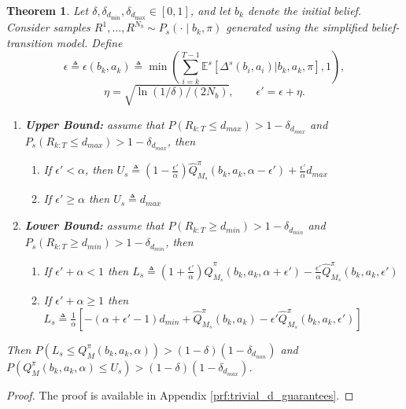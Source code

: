 \documentclass[acmlarge, manuscript, screen, review, natbib=false, oneside]{acmart}
\newtheorem{theorem}{Theorem}[section]
\begin{document}
\begin{theorem}\label{thm:trivial_d_guarantees}
	Let $\delta,\delta_{d_{\min}}, \delta_{d_{\max}} \in [0,1]$, and let $b_k$ denote the initial belief. Consider samples $R^1,\dots,R^{N_b} \sim P_s(\cdot \mid b_k,\pi)$ generated using the simplified belief-transition model. Define
	\begin{equation}
		\epsilon \triangleq \epsilon(b_k, a_k) \triangleq \min(\sum_{i=k}^{T-1} \mathbb{E}^s[\Delta^s(b_i, a_i)|b_k, a_k,\pi], 1),
	\end{equation}
	\begin{equation}
		\eta = \sqrt{\ln(1/\delta)/(2N_b)}, \qquad \epsilon' = \epsilon + \eta.
	\end{equation}
	\begin{enumerate}
		\item \textbf{Upper Bound:} assume that $P(R_{k:T}\leq d_{max})>1-\delta_{d_{max}}$ and $P_s(R_{k:T}\leq d_{max})>1-\delta_{d_{max}}$, then \begin{enumerate}
			\item If $\epsilon'<\alpha$, then
			$U_s\triangleq (1-\frac{\epsilon'}{\alpha}) \hat{Q}^\pi_{M_s}(b_k,a_k,\alpha-\epsilon') + \frac{\epsilon'}{\alpha}d_{max}$
			\item If $\epsilon' \geq \alpha$ then $U_s\triangleq d_{max}$
		\end{enumerate}
		\item \textbf{Lower Bound:} assume that $P(R_{k:T}\geq d_{min})>1-\delta_{d_{min}}$ and $P_s(R_{k:T}\geq d_{min})>1-\delta_{d_{min}}$, then \begin{enumerate}
			\item If $\epsilon' + \alpha < 1$ then
			$
			L_s\triangleq (1+\frac{\epsilon'}{\alpha}) \hat{Q}^\pi_{M_s}(b_k,a_k,\alpha+\epsilon') - \frac{\epsilon'}{\alpha} \hat{Q}^\pi_{M_s}(b_k,a_k, \epsilon')
			$
			\item If $\epsilon' + \alpha \geq 1$ then 
			$
			L_s\triangleq\frac{1}{\alpha}[-(\alpha + \epsilon' - 1)
			d_{min}+\hat{Q}^\pi_{M_s}(b_k,a_k)-\epsilon' \hat{Q}^\pi_{M_s}(b_k,a_k,\epsilon')]
			$
		\end{enumerate}
	\end{enumerate}
	Then $P(L_s \leq Q_M^\pi(b_k, a_k,\alpha)) > (1-\delta)(1-\delta_{d_{min}})$ and $P(Q_M^\pi(b_k, a_k,\alpha)\leq U_s)> (1-\delta)(1-\delta_{d_{max}})$.
\end{theorem}
\begin{proof}
	The proof is available in Appendix \ref{prf:trivial_d_guarantees}.
\end{proof}
\end{document}
